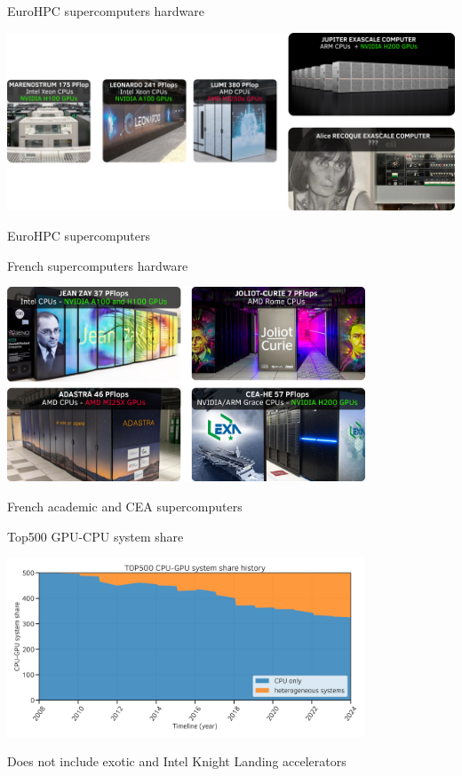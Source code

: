 \documentclass[aspectratio=169]{beamer}
\renewcommand{\caption}[1]{%
    \begin{center}
        \scriptsize #1
    \end{center}%
}
\begin{document}

\begin{frame}{EuroHPC supercomputers hardware}
    \begin{center}
        \includegraphics[width=1\textwidth]{euroHPC.png}

        \caption{EuroHPC supercomputers}
    \end{center}
\end{frame}


\begin{frame}{French supercomputers hardware}
    \begin{center}
    \includegraphics[width=0.8\textwidth]{french_super_computers.png}

    \caption{French academic and CEA supercomputers}
    \end{center}
\end{frame}


\begin{frame}{Top500 GPU-CPU system share}
    \begin{center}
        \includegraphics[width=0.8\textwidth]{top500_cpu_gpu_share_history.png}
    \end{center}

     Does not include exotic and Intel Knight Landing accelerators
\end{frame}
\end{document}
